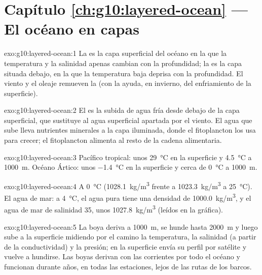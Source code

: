 \section*{Capítulo \ref{ch:g10:layered-ocean} --- El océano en capas}

\begin{solution}{exo:g10:layered-ocean:1}
La  es la capa superficial del océano en la que la temperatura
y la salinidad apenas cambian con la profundidad; la  es la capa
situada debajo, en la que la temperatura baja deprisa con la profundidad. El
viento y el oleaje remueven la  (con la ayuda, en invierno, del
enfriamiento de la superficie).
\end{solution}

\begin{solution}{exo:g10:layered-ocean:2}
El  es la subida de agua fría desde debajo de la capa
superficial, que sustituye al agua superficial apartada por el viento. El
agua que sube lleva nutrientes minerales a la capa iluminada, donde el
fitoplancton los usa para crecer; el fitoplancton alimenta al resto de la
cadena alimentaria.
\end{solution}

\begin{solution}{exo:g10:layered-ocean:3}
Pacífico tropical: unos \qty{29}{\degreeCelsius} en la superficie y
\qty{4.5}{\degreeCelsius} a \qty{1000}{m}. Océano Ártico: unos
\qty{-1.4}{\degreeCelsius} en la superficie y cerca de
\qty{0}{\degreeCelsius} a \qty{1000}{m}.
\end{solution}

\begin{solution}{exo:g10:layered-ocean:4}
A \qty{0}{\degreeCelsius} (\qty{1028.1}{kg/m^3} frente a \qty{1023.3}{kg/m^3}
a \qty{25}{\degreeCelsius}). El agua de mar: a \qty{4}{\degreeCelsius}, el
agua pura tiene una densidad de \qty{1000.0}{kg/m^3}, y el agua de mar de
salinidad 35, unos \qty{1027.8}{kg/m^3} (leídos en la gráfica).
\end{solution}

\begin{solution}{exo:g10:layered-ocean:5}
La boya deriva a \qty{1000}{m}, se hunde hasta \qty{2000}{m} y luego sube a
la superficie midiendo por el camino la temperatura, la salinidad (a partir
de la conductividad) y la presión; en la superficie envía su perfil por
satélite y vuelve a hundirse. Las boyas derivan con las corrientes por todo
el océano y funcionan durante años, en todas las estaciones, lejos de las
rutas de los barcos.
\end{solution}

